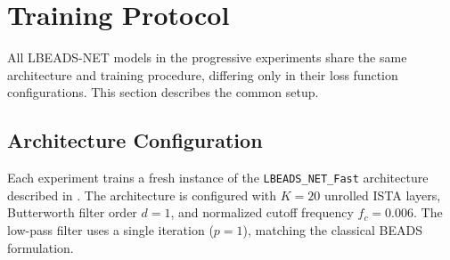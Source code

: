 

\section{Training Protocol}
\label{sec:exp_training}

All LBEADS-NET models in the progressive experiments share the same architecture and training procedure, differing only in their loss function configurations. This section describes the common setup.


\subsection{Architecture Configuration}
\label{sec:exp_architecture}

Each experiment trains a fresh instance of the \texttt{LBEADS\_NET\_Fast} architecture described in . The architecture is configured with $K = 20$ unrolled ISTA layers, Butterworth filter order $d = 1$, and normalized cutoff frequency $f_c = 0.006$. The low-pass filter uses a single iteration ($p = 1$), matching the classical BEADS formulation.

